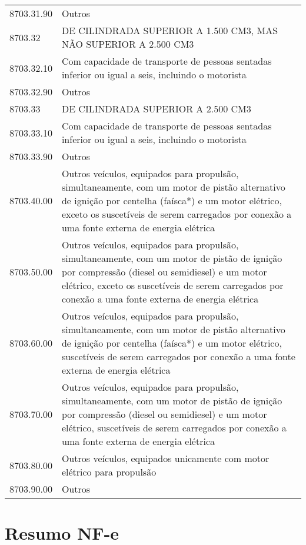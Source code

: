 \documentclass{article}
\newcommand{\parte}[1]{
  \pagebreak
  \vfill
  \partfont{\centering}
  \vspace*{\fill}
    \part{#1}    
  \vspace*{\fill}
  \vfill
  \pagebreak
}
\begin{document}
\begin{center}
\begin{longtable}{
    |p{}
    |p{}|
  }
    8703.31.90 & Outros \\
    8703.32 & DE CILINDRADA SUPERIOR A 1.500 CM3, MAS NÃO SUPERIOR A 2.500 CM3 \\
    8703.32.10 & Com capacidade de transporte de pessoas sentadas inferior ou igual a seis, incluindo o motorista \\
    8703.32.90 & Outros \\
    8703.33 & DE CILINDRADA SUPERIOR A 2.500 CM3 \\
    8703.33.10 & Com capacidade de transporte de pessoas sentadas inferior ou igual a seis, incluindo o motorista \\
    8703.33.90 & Outros \\
    8703.40.00 & Outros veículos, equipados para propulsão, simultaneamente, com um motor de pistão alternativo de ignição por centelha (faísca*) e um motor elétrico, exceto os suscetíveis de serem carregados por conexão a uma fonte externa de energia elétrica \\
    8703.50.00 & Outros veículos, equipados para propulsão, simultaneamente, com um motor de pistão de ignição por compressão (diesel ou semidiesel) e um motor elétrico, exceto os suscetíveis de serem carregados por conexão a uma fonte externa de energia elétrica \\
    8703.60.00 & Outros veículos, equipados para propulsão, simultaneamente, com um motor de pistão alternativo de ignição por centelha (faísca*) e um motor elétrico, suscetíveis de serem carregados por conexão a uma fonte externa de energia elétrica \\
    8703.70.00 & Outros veículos, equipados para propulsão, simultaneamente, com um motor de pistão de ignição por compressão (diesel ou semidiesel) e um motor elétrico, suscetíveis de serem carregados por conexão a uma fonte externa de energia elétrica \\
    8703.80.00 & Outros veículos, equipados unicamente com motor elétrico para propulsão \\
    8703.90.00 & Outros \\
    \hline
  \end{longtable}
\end{center}

\parte{Resumo NF-e}
\end{document}
